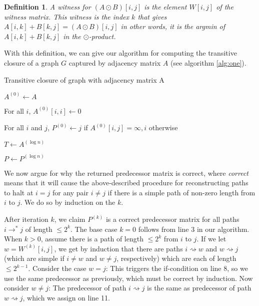 \documentclass[a4paper,12pt,oneside,openright]{report}
\newtheorem{definition}{Definition}
\begin{document}
\begin{definition}
    A witness for $(A \odot B)[i, j]$ is the element $W[i,j]$ of the witness
    matrix. This witness is the index $k$ that gives
    $A[i,k] + B[k,j] = (A \odot B)[i,j]$ in other words, it is the argmin of
    $A[i,k] + B[k,j]$ in the $\odot$-product.
\end{definition}

With this definition, we can give our algorithm for computing the transitive closure
of a graph $G$ captured by adjacency matrix $A$ (see algorithm \ref{alg:one}).

\begin{algorithm}
    \caption{Transitive closure of graph with adjacency matrix A}\label{alg:one}
    $A^{(0)} \gets A$

    For all $i$, $A^{(0)}[i, i] \gets 0$

    For all $i$ and $j$, $P^{(0)} \gets j$ if $A^{(0)}[i,j] = \infty, i$ otherwise


    $T \gets A^{(\log n)}$

    $P \gets P^{(\log n)}$

\end{algorithm}

We now argue for why the returned predecessor matrix is correct, where \textit{correct}
means that it will cause the above-described procedure for reconstructing paths to
halt at $i=j$ for any pair $i\neq j$ if there is a simple path of non-zero length from $i$
to $j$.  We do so by induction on the $k$.

After iteration $k$, we claim $P^{(k)}$ is a correct predecessor matrix for all paths
$i \rightarrow^* j$ of length $\leq 2^k$. The base case $k=0$ follows from line 3
in our algorithm. When $k > 0$, assume there is a path of length $\leq 2^k$ from $i$
to $j$. If we let $w = W^{(k)}[i,j]$, we get by induction that there are paths
$i \rightsquigarrow w$ and $w \rightsquigarrow j$ (which are simple if $i\neq w$
and $w\neq j$, respectively) which are each of length $\leq 2^{k-1}$. Consider the
case $w=j$: This triggers the if-condition on line 8, so we use the same predecessor
as previously, which must be correct by induction. Now consider $w\neq j$: The
predecessor of path $i \rightsquigarrow j$ is the same as predecessor of path
$w \rightsquigarrow j$, which we assign on line 11.
\end{document}
